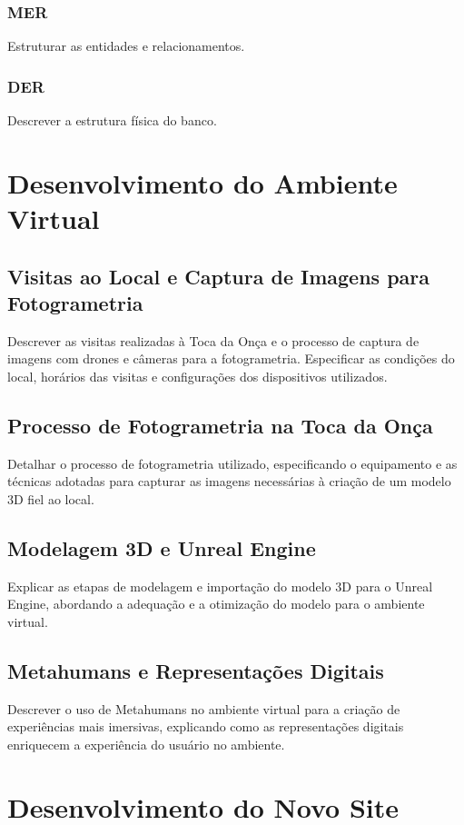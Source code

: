 \subsubsection{MER}
Estruturar as entidades e relacionamentos.

\subsubsection{DER}
Descrever a estrutura física do banco.

\section{Desenvolvimento do Ambiente Virtual}
\subsection{Visitas ao Local e Captura de Imagens para Fotogrametria}
Descrever as visitas realizadas à Toca da Onça e o processo de captura de imagens com drones e câmeras para a fotogrametria. Especificar as condições do local, horários das visitas e configurações dos dispositivos utilizados.

\subsection{Processo de Fotogrametria na Toca da Onça}
Detalhar o processo de fotogrametria utilizado, especificando o equipamento e as técnicas adotadas para capturar as imagens necessárias à criação de um modelo 3D fiel ao local.

\subsection{Modelagem 3D e Unreal Engine}
Explicar as etapas de modelagem e importação do modelo 3D para o Unreal Engine, abordando a adequação e a otimização do modelo para o ambiente virtual.

\subsection{Metahumans e Representações Digitais}
Descrever o uso de Metahumans no ambiente virtual para a criação de experiências mais imersivas, explicando como as representações digitais enriquecem a experiência do usuário no ambiente.


\section{Desenvolvimento do Novo Site}
